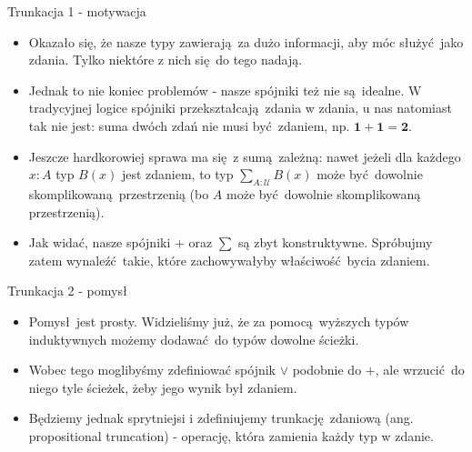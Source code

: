 \documentclass{beamer}
\newcommand{\U}{\mathcal{U}}
\begin{document}
\begin{frame}{Trunkacja 1 - motywacja}
\begin{itemize}
	\item Okazało się, że nasze typy zawierają za dużo informacji, aby móc służyć jako zdania. Tylko niektóre z nich się do tego nadają.
	\item Jednak to nie koniec problemów - nasze spójniki też nie są idealne. W tradycyjnej logice spójniki przekształcają zdania w zdania, u nas natomiast tak nie jest: suma dwóch zdań nie musi być zdaniem, np. $\textbf{1} + \textbf{1} = \textbf{2}$.
	\item Jeszcze hardkorowiej sprawa ma się z sumą zależną: nawet jeżeli dla każdego $x : A$ typ $B(x)$ jest zdaniem, to typ $\sum_{A : \U} B(x)$ może być dowolnie skomplikowaną przestrzenią (bo $A$ może być dowolnie skomplikowaną przestrzenią).
	\item Jak widać, nasze spójniki $+$ oraz $\sum$ są zbyt konstruktywne. Spróbujmy zatem wynaleźć takie, które zachowywałyby właściwość bycia zdaniem.
\end{itemize}
\end{frame}

\begin{frame}{Trunkacja 2 - pomysł}
\begin{itemize}
	\item Pomysł jest prosty. Widzieliśmy już, że za pomocą wyższych typów induktywnych możemy dodawać do typów dowolne ścieżki.
	\item Wobec tego moglibyśmy zdefiniować spójnik $\lor$ podobnie do $+$, ale wrzucić do niego tyle ścieżek, żeby jego wynik był zdaniem.
	\item Będziemy jednak sprytniejsi i zdefiniujemy trunkację zdaniową (ang. propositional truncation) - operację, która zamienia każdy typ w zdanie.
\end{itemize}
\end{frame}
\end{document}

